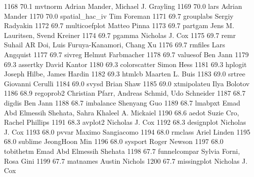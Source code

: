   1168     70.1    mvtnorm       Adrian Mander, Michael J. Grayling      
  1169     70.0    lars          Adrian Mander                           
  1170     70.0    spatial_hac_iv  Tim Foreman                             
  1171     69.7    grouplabs     Sergiy Radyakin                         
  1172     69.7    multicoefplot  Matteo Pinna                            
  1173     69.7    partgam       Jens M. Lauritsen, Svend Kreiner        
  1174     69.7    pgamma        Nicholas J. Cox                         
  1175     69.7    remr          Suhail AR Doi, Luis Furuya-Kanamori,    
                                   Chang Xu                                
  1176     69.7    rmfiles       Lars Angquist                           
  1177     69.7    sivreg        Helmut Farbmacher                       
  1178     69.7    valuesof      Ben Jann                                
  1179     69.3    assertky      David Kantor                            
  1180     69.3    colorscatter  Simon Hess                              
  1181     69.3    hplogit       Joseph Hilbe, James Hardin              
  1182     69.3    htmlcb        Maarten L. Buis                         
  1183     69.0    srtree        Giovanni Cerulli                        
  1184     69.0    svysd         Brian Shaw                              
  1185     69.0    xtmipolateu   Ilya Bolotov                            
  1186     68.9    regoprob2     Christian Pfarr, Andreas Schmid, Udo    
                                   Schneider                               
  1187     68.7    digdis        Ben Jann                                
  1188     68.7    imbalance     Shenyang Guo                            
  1189     68.7    lmabpxt       Emad Abd Elmessih Shehata, Sahra        
                                   Khaleel A. Mickaiel                     
  1190     68.6    aedot         Suzie Cro, Rachel Phillips              
  1191     68.3    avplot2       Nicholas J. Cox                         
  1192     68.3    designplot    Nicholas J. Cox                         
  1193     68.0    pvvar         Maximo Sangiacomo                       
  1194     68.0    rmclass       Ariel Linden                            
  1195     68.0    sublime       JeongHoon Min                           
  1196     68.0    sysport       Roger Newson                            
  1197     68.0    tobithetm     Emad Abd Elmessih Shehata               
  1198     67.7    funnelcompar  Sylvia Forni, Rosa Gini                 
  1199     67.7    matnames      Austin Nichols                          
  1200     67.7    missingplot   Nicholas J. Cox                         
